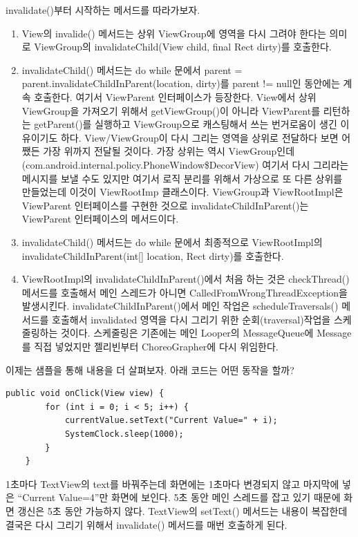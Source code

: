 invalidate()부터 시작하는 메서드를 따라가보자.
\begin{enumerate}
\item View의 invalide() 메서드는 상위 ViewGroup에 영역을 다시 그려야 한다는 의미로 ViewGroup의 invalidateChild(View child, final Rect dirty)를 호출한다. 
\item invalidateChild() 메서드는 do while 문에서 parent = parent.invalidateChildInParent(location, dirty)를 parent != null인 동안에는 계속 호출한다. 여기서 ViewParent 인터페이스가 등장한다. View에서 상위 ViewGroup을 가져오기 위해서 getViewGroup()이 아니라 ViewParent를 리턴하는 getParent()를 실행하고 ViewGroup으로 캐스팅해서 쓰는 번거로움이 생긴 이유이기도 하다. 
View/ViewGroup이 다시 그리는 영역을 상위로 전달하다 보면 어쨌든 가장 위까지 전달될 것이다. 가장 상위는 역시 ViewGroup인데(com.android.internal.policy.PhoneWindow\$DecorView) 여기서 다시 그리라는 메시지를 보낼 수도 있지만 여기서 로직 분리를 위해서 가상으로 또 다른 상위를 만들었는데 이것이 ViewRootImp 클래스이다.
ViewGroup과 ViewRootImpl은 ViewParent 인터페이스를 구현한 것으로 invalidateChildInParent()는 ViewParent 인터페이스의 메서드이다.
\item invalidateChild() 메서드는 do while 문에서 최종적으로 ViewRootImpl의 invalidateChildInParent(int[] location, Rect dirty)를 호출한다.
\item ViewRootImpl의 invalidateChildInParent()에서 처음 하는 것은 checkThread() 메서드를 호출해서 메인 스레드가 아니면 CalledFromWrongThreadException을 발생시킨다.
invalidateChildInParent()에서 메인 작업은 scheduleTraversals() 메서드를 호출해서 invalidated 영역을 다시 그리기 위한 순회(traversal)작업을 스케줄링하는 것이다. 스케줄링은 기존에는 메인 Looper의 MessageQueue에 Message를 직접 넣었지만 젤리빈부터 ChoreoGrapher에 다시 위임한다.
\end{enumerate}

이제는 샘플을 통해 내용을 더 살펴보자. 아래 코드는 어떤 동작을 할까?
\begin{lstlisting}[frame=single] 
	public void onClick(View view) {
		for (int i = 0; i < 5; i++) {
			currentValue.setText("Current Value=" + i);
			SystemClock.sleep(1000);
		}
	}
\end{lstlisting}
1초마다 TextView의 text를 바꿔주는데 화면에는 1초마다 변경되지 않고 마지막에 넣은 ``Current Value=4''만 화면에 보인다.
5초 동안 메인 스레드를 잡고 있기 때문에 화면 갱신은 5초 동안 가능하지 않다. 
TextView의 setText() 메서드는 내용이 복잡한데 결국은 다시 그리기 위해서 invalidate() 메서드를 매번 호출하게 된다.\\

